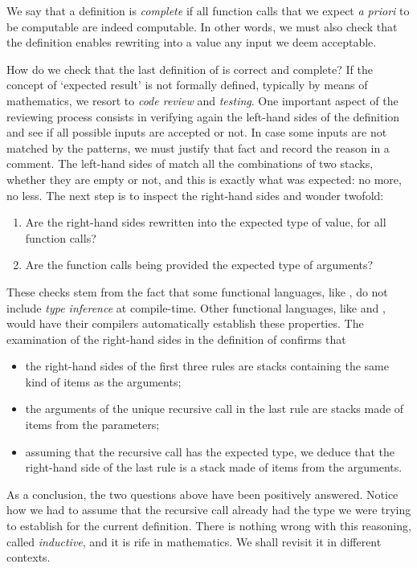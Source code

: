 We say that a definition is \emph{complete} if all function calls that
we expect \emph{a priori} to be computable are indeed computable. In
other words, we must also check that the definition enables rewriting
into a value any input we deem acceptable.

How do we check that the last definition of  is correct
and complete? If the concept of `expected result' is not formally
defined, typically by means of mathematics, we resort to \emph{code
review} and \emph{testing}. One important aspect of the reviewing
process consists in verifying again the left\hyp{}hand sides of the
definition and see if all possible inputs are accepted or not. In case
some inputs are not matched by the patterns, we must justify that fact
and record the reason in a comment. The left\hyp{}hand sides of
 match all the combinations of two stacks, whether they
are empty or not, and this is exactly what was expected: no more, no
less. The next step is to inspect the right\hyp{}hand sides and wonder
twofold:
\begin{enumerate}

  \item Are the right\hyp{}hand sides rewritten into the expected type
    of value, for all function calls?

  \item Are the function calls being provided the expected type of
    arguments?

\end{enumerate}
These checks stem from the fact that some functional languages, like
\Erlang, do not include \emph{type inference} at
compile\hyp{}time. Other functional languages, like \OCaml and
\Haskell, would have their compilers automatically establish these
properties. The examination of the right\hyp{}hand sides in the
definition of  confirms that
\begin{itemize}

\item the right\hyp{}hand sides of the first three rules are stacks
  containing the same kind of items as the arguments;

\item the arguments of the unique recursive call in the last rule
  are stacks made of items from the parameters;

\item assuming that the recursive call has the expected type, we
  deduce that the right\hyp{}hand side of the last rule is a stack
  made of items from the arguments.

\end{itemize}
As a conclusion, the two questions above have been positively
answered. Notice how we had to assume that the recursive call already
had the type we were trying to establish for the current
definition. There is nothing wrong with this reasoning, called
\emph{inductive}, and it is rife in mathematics. We shall revisit it
in different contexts.

